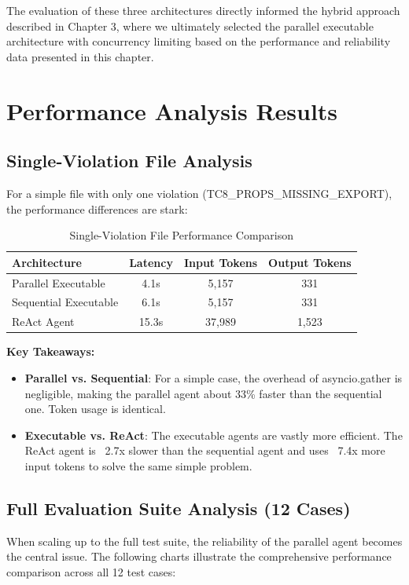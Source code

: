 \begin{spacing}{1.2}
The evaluation of these three architectures directly informed the hybrid approach described in Chapter 3, where we ultimately selected the parallel executable architecture with concurrency limiting based on the performance and reliability data presented in this chapter.

\section{Performance Analysis Results}

\subsection{Single-Violation File Analysis}
For a simple file with only one violation (TC8\_PROPS\_MISSING\_EXPORT), the performance differences are stark:

\begin{table}[H]
\centering
\caption{Single-Violation File Performance Comparison}
\footnotesize
\begin{tabular}{|l|c|c|c|}
\hline 
\textbf{Architecture} & \textbf{Latency} & \textbf{Input Tokens} & \textbf{Output Tokens} \\
\hline 
Parallel Executable & 4.1s & 5,157 & 331 \\
\hline
Sequential Executable & 6.1s & 5,157 & 331 \\
\hline
ReAct Agent & 15.3s & 37,989 & 1,523 \\
\hline
\end{tabular}
\label{tab:single_violation_performance}
\end{table}

\textbf{Key Takeaways:}
\begin{itemize}
    \item \textbf{Parallel vs. Sequential}: For a simple case, the overhead of asyncio.gather is negligible, making the parallel agent about 33\% faster than the sequential one. Token usage is identical.
    \item \textbf{Executable vs. ReAct}: The executable agents are vastly more efficient. The ReAct agent is ~2.7x slower than the sequential agent and uses ~7.4x more input tokens to solve the same simple problem.
\end{itemize}

\subsection{Full Evaluation Suite Analysis (12 Cases)}
When scaling up to the full test suite, the reliability of the parallel agent becomes the central issue. The following charts illustrate the comprehensive performance comparison across all 12 test cases:


\end{spacing}
